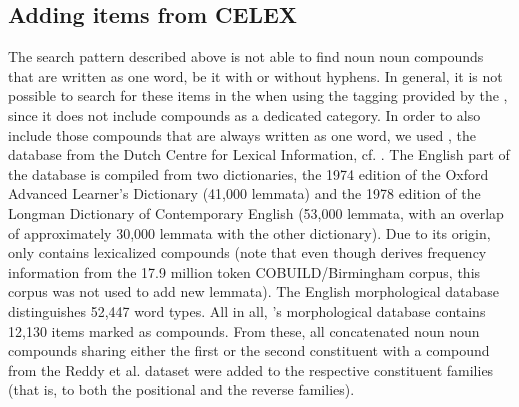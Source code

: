  
\subsection{Adding items from CELEX}
\label{sec:celex}
The search pattern described above is not able to find noun noun
compounds that are written as one word, be it with or without
hyphens. In general, it is not possible to search for these items in
the  when using the tagging provided by the , since it does not
include compounds as a dedicated category. In order to also include
those compounds that are always written as one word, we used ,
the database from the Dutch Centre for Lexical Information, cf. \citet{Baayenetal:1995}. 
The English part of the 
database is compiled from two dictionaries, the 1974 edition of the
Oxford Advanced Learner's Dictionary (41,000 lemmata) and the 1978
edition of the Longman Dictionary of Contemporary English (53,000
lemmata, with an overlap of approximately 30,000 lemmata with the other
dictionary). Due to its origin,  only contains lexicalized
compounds (note that even though  derives frequency information from
the 17.9 million token COBUILD/Birmingham corpus, this corpus was not
used to add new lemmata).
The English morphological
database distinguishes 52,447 word types.  All in all, 's morphological database contains 12,130 items marked as compounds. From
these, all concatenated noun noun compounds sharing either the first
or the second constituent with a compound from the Reddy et al. dataset were added to the
respective constituent families (that is, to both the positional and
the reverse families).

